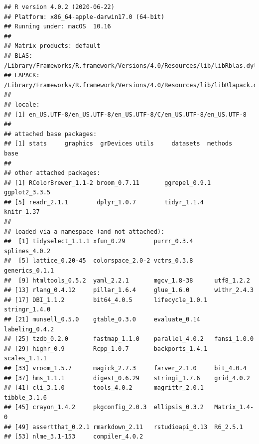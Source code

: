 \documentclass[]{article}
\begin{document}
\begin{verbatim}
## R version 4.0.2 (2020-06-22)
## Platform: x86_64-apple-darwin17.0 (64-bit)
## Running under: macOS  10.16
## 
## Matrix products: default
## BLAS:   /Library/Frameworks/R.framework/Versions/4.0/Resources/lib/libRblas.dylib
## LAPACK: /Library/Frameworks/R.framework/Versions/4.0/Resources/lib/libRlapack.dylib
## 
## locale:
## [1] en_US.UTF-8/en_US.UTF-8/en_US.UTF-8/C/en_US.UTF-8/en_US.UTF-8
## 
## attached base packages:
## [1] stats     graphics  grDevices utils     datasets  methods   base     
## 
## other attached packages:
## [1] RColorBrewer_1.1-2 broom_0.7.11       ggrepel_0.9.1      ggplot2_3.3.5     
## [5] readr_2.1.1        dplyr_1.0.7        tidyr_1.1.4        knitr_1.37        
## 
## loaded via a namespace (and not attached):
##  [1] tidyselect_1.1.1 xfun_0.29        purrr_0.3.4      splines_4.0.2   
##  [5] lattice_0.20-45  colorspace_2.0-2 vctrs_0.3.8      generics_0.1.1  
##  [9] htmltools_0.5.2  yaml_2.2.1       mgcv_1.8-38      utf8_1.2.2      
## [13] rlang_0.4.12     pillar_1.6.4     glue_1.6.0       withr_2.4.3     
## [17] DBI_1.1.2        bit64_4.0.5      lifecycle_1.0.1  stringr_1.4.0   
## [21] munsell_0.5.0    gtable_0.3.0     evaluate_0.14    labeling_0.4.2  
## [25] tzdb_0.2.0       fastmap_1.1.0    parallel_4.0.2   fansi_1.0.0     
## [29] highr_0.9        Rcpp_1.0.7       backports_1.4.1  scales_1.1.1    
## [33] vroom_1.5.7      magick_2.7.3     farver_2.1.0     bit_4.0.4       
## [37] hms_1.1.1        digest_0.6.29    stringi_1.7.6    grid_4.0.2      
## [41] cli_3.1.0        tools_4.0.2      magrittr_2.0.1   tibble_3.1.6    
## [45] crayon_1.4.2     pkgconfig_2.0.3  ellipsis_0.3.2   Matrix_1.4-0    
## [49] assertthat_0.2.1 rmarkdown_2.11   rstudioapi_0.13  R6_2.5.1        
## [53] nlme_3.1-153     compiler_4.0.2
\end{verbatim}
\end{document}
